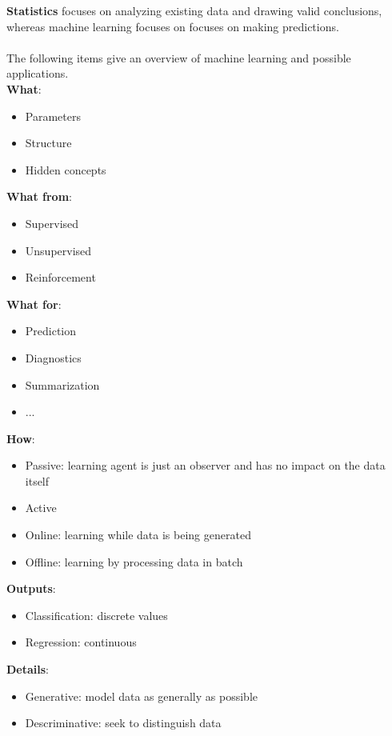 \documentclass{report}
\begin{document}
{\bf Statistics} focuses on analyzing existing data and drawing valid conclusions, whereas machine learning focuses on focuses on making predictions.
\\
\\
The following items give an overview of machine learning and possible applications.
\\
{\bf What}:
\begin{itemize}
  \item Parameters
  \item Structure
  \item Hidden concepts
\end{itemize}

{\bf What from}:
\begin{itemize}
  \item Supervised
  \item Unsupervised
  \item Reinforcement
\end{itemize}

{\bf What for}:
\begin{itemize}
  \item Prediction
  \item Diagnostics
  \item Summarization
  \item ...
\end{itemize}

{\bf How}:
\begin{itemize}
  \item Passive: learning agent is just an observer and has no impact on the data itself
  \item Active
  \item Online: learning while data is being generated
  \item Offline: learning by processing data in batch
\end{itemize}

{\bf Outputs}:
\begin{itemize}
  \item Classification: discrete values
  \item Regression: continuous
\end{itemize}

{\bf Details}:
\begin{itemize}
  \item Generative: model data as generally as possible
  \item Descriminative: seek to distinguish data
\end{itemize}
\end{document}
